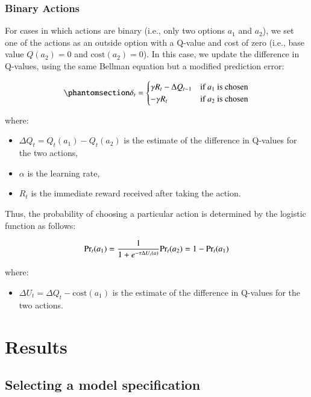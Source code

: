 \documentclass[
  number,
  preprint,
  3p,
  onecolumn]{elsarticle}
\providecommand{\tightlist}{%
  \setlength{\itemsep}{0pt}\setlength{\parskip}{0pt}}
\begin{document}
\subsubsection{Binary Actions}\label{binary-actions}

For cases in which actions are binary (i.e., only two options \(a_1\)
and \(a_2\)), we set one of the actions as an outside option with a
Q-value and cost of zero (i.e., base value \(Q(a_2)=0\) and
\(\text{cost}(a_2)=0\)). In this case, we update the difference in
Q-values, using the same Bellman equation but a modified prediction
error:

\begin{equation}\phantomsection\label{eq-state-free}{
\delta_t =
\begin{cases}
\gamma R_t - \Delta Q_{t-1} & \text{if } a_1 \text{ is chosen} \\
-\gamma R_t & \text{if } a_2 \text{ is chosen}
\end{cases}
}\end{equation}

where:

\begin{itemize}
\item
  \(\Delta Q_{t}=Q_{t}(a_1)-Q_{t}(a_2)\) is the estimate of the
  difference in Q-values for the two actions,
\item
  \(\alpha\) is the learning rate,
\item
  \(R_t\) is the immediate reward received after taking the action.
\end{itemize}

Thus, the probability of choosing a particular action is determined by
the logistic function as follows:

\[
\text{Pr}_t(a_1) = \frac{1}{1+e^{-\tau \Delta U_{t}(a)}}
\\
\text{Pr}_t(a_2) = 1 - \text{Pr}_t(a_1)
\]

where:

\begin{itemize}
\tightlist
\item
  \(\Delta U_{t}=\Delta Q_{t} - \text{cost}(a_1)\) is the estimate of
  the difference in Q-values for the two actions.
\end{itemize}

\section{Results}\label{results}

\subsection{Selecting a model
specification}\label{selecting-a-model-specification}
\end{document}
